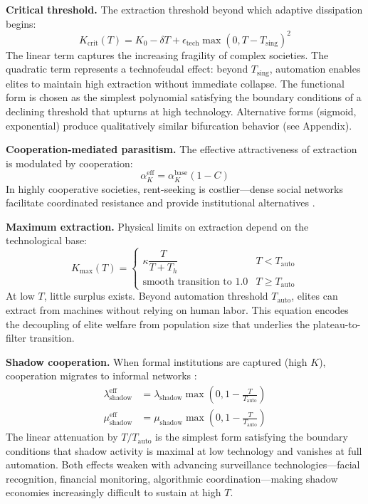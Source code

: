 \textbf{Critical threshold.} The extraction threshold beyond which adaptive dissipation begins:
\begin{equation}
K_{\text{crit}}(T) = K_0 - \delta T + \epsilon_{\text{tech}} \max(0, T - T_{\text{sing}})^2
\label{eq:kcrit}
\end{equation}
The linear term captures the increasing fragility of complex societies. The quadratic term represents a technofeudal effect: beyond $T_{\text{sing}}$, automation enables elites to maintain high extraction without immediate collapse. The functional form is chosen as the simplest polynomial satisfying the boundary conditions of a declining threshold that upturns at high technology. Alternative forms (sigmoid, exponential) produce qualitatively similar bifurcation behavior (see Appendix).

\textbf{Cooperation-mediated parasitism.} The effective attractiveness of extraction is modulated by cooperation:
\begin{equation}
\alpha_K^{\text{eff}} = \alpha_K^{\text{base}} (1 - C)
\label{eq:alphak}
\end{equation}
In highly cooperative societies, rent-seeking is costlier---dense social networks facilitate coordinated resistance and provide institutional alternatives \cite{olson1965,putnam2000}.

\textbf{Maximum extraction.} Physical limits on extraction depend on the technological base:
\begin{equation}
K_{\max}(T) = \begin{cases}
\kappa \dfrac{T}{T + T_h} & T < T_{\text{auto}} \\[8pt]
\text{smooth transition to } 1.0 & T \geq T_{\text{auto}}
\end{cases}
\label{eq:kmax}
\end{equation}
At low $T$, little surplus exists. Beyond automation threshold $T_{\text{auto}}$, elites can extract from machines without relying on human labor. This equation encodes the decoupling of elite welfare from population size that underlies the plateau-to-filter transition.

\textbf{Shadow cooperation.} When formal institutions are captured (high $K$), cooperation migrates to informal networks \cite{de_soto1989}:
\begin{align}
\lambda_{\text{shadow}}^{\text{eff}} &= \lambda_{\text{shadow}} \max\left(0, 1 - \frac{T}{T_{\text{auto}}}\right) \\
\mu_{\text{shadow}}^{\text{eff}} &= \mu_{\text{shadow}} \max\left(0, 1 - \frac{T}{T_{\text{auto}}}\right)
\end{align}
The linear attenuation by $T/T_{\text{auto}}$ is the simplest form satisfying the boundary conditions that shadow activity is maximal at low technology and vanishes at full automation. Both effects weaken with advancing surveillance technologies---facial recognition, financial monitoring, algorithmic coordination---making shadow economies increasingly difficult to sustain at high $T$.

